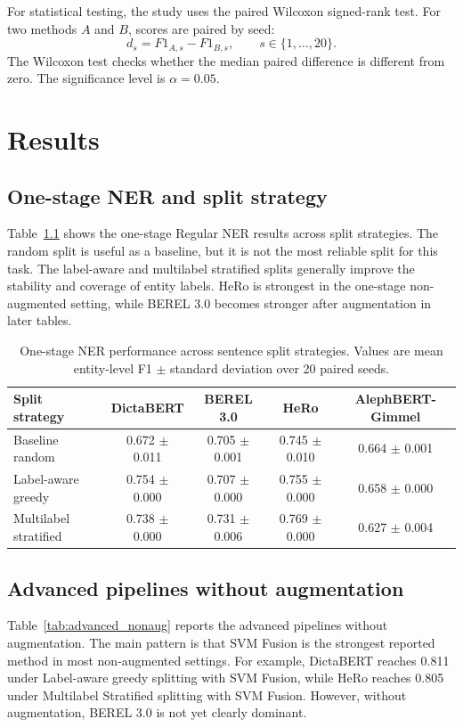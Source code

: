 \documentclass[12pt,a4paper]{report}
\begin{document}
For statistical testing, the study uses the paired Wilcoxon signed-rank test. For two methods $A$ and $B$, scores are paired by seed:
\[
d_s=F1_{A,s}-F1_{B,s},\qquad s\in\{1,\ldots,20\}.
\]
The Wilcoxon test checks whether the median paired difference is different from zero. The significance level is $\alpha=0.05$.

\chapter{Results}
\section{One-stage NER and split strategy}
Table~\ref{tab:one_stage_split} shows the one-stage Regular NER results across split strategies. The random split is useful as a baseline, but it is not the most reliable split for this task. The label-aware and multilabel stratified splits generally improve the stability and coverage of entity labels. HeRo is strongest in the one-stage non-augmented setting, while BEREL 3.0 becomes stronger after augmentation in later tables.

\begin{table}[htbp]
\centering
\small
\caption{One-stage NER performance across sentence split strategies. Values are mean entity-level F1 $\pm$ standard deviation over 20 paired seeds.}
\label{tab:one_stage_split}
\begin{tabular}{lcccc}
\toprule
Split strategy & DictaBERT & BEREL 3.0 & HeRo & AlephBERT-Gimmel \\
\midrule
Baseline random & 0.672 $\pm$ 0.011 & 0.705 $\pm$ 0.001 & 0.745 $\pm$ 0.010 & 0.664 $\pm$ 0.001 \\
Label-aware greedy & 0.754 $\pm$ 0.000 & 0.707 $\pm$ 0.000 & 0.755 $\pm$ 0.000 & 0.658 $\pm$ 0.000 \\
Multilabel stratified & 0.738 $\pm$ 0.000 & 0.731 $\pm$ 0.006 & 0.769 $\pm$ 0.000 & 0.627 $\pm$ 0.004 \\
\bottomrule
\end{tabular}
\end{table}

\section{Advanced pipelines without augmentation}
Table~\ref{tab:advanced_nonaug} reports the advanced pipelines without augmentation. The main pattern is that SVM Fusion is the strongest reported method in most non-augmented settings. For example, DictaBERT reaches 0.811 under Label-aware greedy splitting with SVM Fusion, while HeRo reaches 0.805 under Multilabel Stratified splitting with SVM Fusion. However, without augmentation, BEREL 3.0 is not yet clearly dominant.
\end{document}
